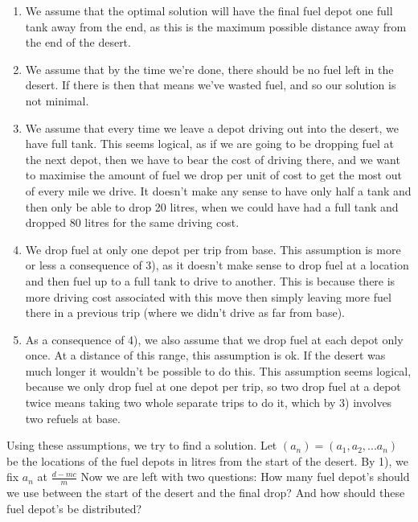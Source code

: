 \documentclass{homework}
\begin{document}
\begin{enumerate}
    \item We assume that the optimal solution will have the final fuel depot one full tank away from the end, as this is the maximum possible distance away from the end of the desert.
    \item We assume that by the time we're done, there should be no fuel left in the desert. If there is then that means we've wasted fuel, and so our solution is not minimal.
    \item We assume that every time we leave a depot driving out into the desert, we have full tank. This seems logical, as if we are going to be dropping fuel at the next depot, then we have to bear the cost of driving there, and we want to maximise the amount of fuel we drop per unit of cost to get the most out of every mile we drive. It doesn't make any sense to have only half a tank and then only be able to drop 20 litres, when we could have had a full tank and dropped 80 litres for the same driving cost.
    \item We drop fuel at only one depot per trip from base. This assumption is more or less a consequence of 3), as it doesn't make sense to drop fuel at a location and then fuel up to a full tank to drive to another. This is because there is more driving cost associated with this move then simply leaving more fuel there in a previous trip (where we didn't drive as far from base).
    \item As a consequence of 4), we also assume that we drop fuel at each depot only once. At a distance of this range, this assumption is ok. If the desert was much longer it wouldn't be possible to do this. This assumption seems logical, because we only drop fuel at one depot per trip, so two drop fuel at a depot twice means taking two whole separate trips to do it, which by 3) involves two refuels at base.
    
\end{enumerate}
Using these assumptions, we try to find a solution.
\newline
Let $(a_n) = (a_1,a_2,...a_n)$ be the locations of the fuel depots in litres from the start of the desert.
\newline\newline
By 1), we fix $a_n$ at $\frac{d-mc}{m}$
\newline\newline
Now we are left with two questions: How many fuel depot's should we use between the start of the desert and the final drop? And how should these fuel depot's be distributed?
\end{document}
